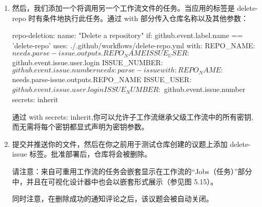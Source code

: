 \begin{enumerate}
\begin{shell}
jobs:
  parse-issue:
    runs-on: ubuntu-latest
    outputs:
      REPO_NAME: ${{ steps.repo-request.outputs.REPO_NAME }}
    steps:
      - name: Issue Forms Body Parser
        id: parse
        uses: zentered/issue-forms-body-parser@v2.0.0
      - name: Repository Request Validation
        id: repo-request
        env:
          GH_TOKEN: ${{ github.token }}
        run: |
          repo_name=$(echo '${{ steps.parse.outputs.data }}' | jq -r '.name.text')
          repo_dept=$(echo '${{ steps.parse.outputs.data }}' | jq -r '.department.text')
          repo_full_name=$repo_dept-$repo_name
          echo "REPO_NAME=$repo_full_name" >> "$GITHUB_OUTPUT"
\end{shell}

\item 
然后，我们添加一个将调用另一个工作流文件的任务。当应用的标签是 delete-repo 时有条件地执行此任务。通过 with 部分传入仓库名称以及其他参数：

\begin{shell}
repo-deletion:
  name: "Delete a repository"
  if: github.event.label.name == 'delete-repo'
  uses: ./.github/workflows/delete-repo.yml
  with:
    REPO_NAME: ${{ needs.parse-issue.outputs.REPO_NAME }}
    ISSUE_USER: ${{ github.event.issue.user.login }}
    ISSUE_NUMBER: ${{ github.event.issue.number }}
    needs: parse-issue
  with:
    REPO_NAME: ${{ needs.parse-issue.outputs.REPO_NAME }}
    ISSUE_USER: ${{ github.event.issue.user.login }}
    ISSUE_NUMBER: ${{ github.event.issue.number }}
  secrets: inherit
\end{shell}

通过 with secrets: inherit,你可以允许子工作流继承父级工作流中的所有密钥,而无需将每个密钥都显式声明为密钥参数。

\item 
提交并推送你的文件，然后在你之前用于测试仓库创建的议题上添加 delete-issue 标签。批准部署后，仓库将会被删除。

请注意：来自可重用工作流的任务会嵌套显示在工作流的“Jobs（任务）”部分中，并且在可视化设计器中也会以嵌套形式展示（参见图 5.15）。


同时注意，在删除成功的通知评论之后，该议题会被自动关闭。

\end{enumerate}


